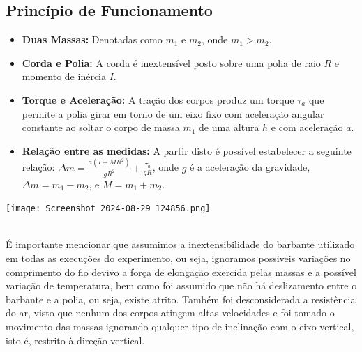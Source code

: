\documentclass[a4papper, 10pt]{article}
\begin{document}
\subsection{Princípio de Funcionamento}
\vspace{0.10 cm}
\begin{minipage}{0.6\textwidth} %
    \begin{itemize}
        \item \textbf{Duas Massas:} Denotadas como $m_1$ e $m_2$, onde $m_1 > m_2$.
        \item \textbf{Corda e Polia:} A corda é inextensível posto sobre uma polia de raio $R$ e momento de inércia $I$.
        \item \textbf{Torque e Aceleração:} A tração dos corpos produz um torque {\large $\tau_a$} que permite a polia girar em torno de um eixo fixo com aceleração angular constante ao soltar o corpo de massa $m_1$ de uma altura $h$ e com aceleração $a$.
        \item \textbf{Relação entre as medidas:} A partir disto é possível estabelecer a seguinte relação: $\Delta m = \frac{a (I + MR^2)}{gR^2} + \frac{\tau_a}{gR}$,
        onde \( g \) é a aceleração da gravidade, \( \Delta m = m_1 - m_2 \), e $M = m_1 + m_2$.
    \end{itemize}
\end{minipage}
\hfill
\begin{minipage}{0.35\textwidth} %
    \centering
    \texttt{[image: Screenshot 2024-08-29 124856.png]}
    \
    
    \label{fig:maquina_atwood}
\end{minipage}
\\

\vspace{0.15cm}
\indent É importante mencionar que assumimos a inextensibilidade do barbante utilizado em todas as execuções do experimento, ou seja, ignoramos possiveis variações no comprimento do fio devivo a força de elongação exercida pelas massas e a possível variação de temperatura, bem como foi assumido que não há deslizamento entre o barbante e a polia, ou seja, existe atrito. Também foi desconsiderada
a resistência do ar, visto que nenhum dos corpos atingem altas velocidades e foi tomado o movimento das massas ignorando qualquer tipo de inclinação com o eixo vertical, isto é, restrito à direção vertical.
\vspace{0.10 cm}
\end{document}
